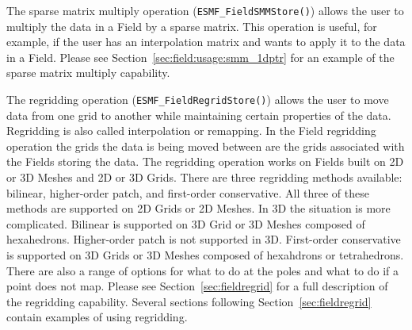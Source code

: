 The sparse matrix multiply operation ({\tt ESMF\_FieldSMMStore()}) allows the user to multiply the data in a Field by a sparse matrix. This operation is useful, for example, if the user has an interpolation matrix and wants to apply it to the data in a Field. Please see Section~\ref{sec:field:usage:smm_1dptr}
for an example of the sparse matrix multiply capability.

The regridding operation ({\tt ESMF\_FieldRegridStore()}) allows the user to move data from one grid to another while maintaining certain properties
of the data. Regridding is also called interpolation or remapping. In the Field regridding operation the grids the data is being moved between
are the grids associated with the Fields storing the data. The regridding operation works on Fields built on 2D or 3D Meshes and 2D or 3D Grids. 
There are three regridding methods available: bilinear, higher-order patch, and first-order conservative. All three of these methods are 
supported on 2D Grids or 2D Meshes. In 3D the situation is more complicated. Bilinear 
is supported on 3D Grid or 3D Meshes composed of hexahedrons. Higher-order patch is not supported in 3D. First-order conservative 
is supported on 3D Grids or 3D Meshes composed of hexahdrons or tetrahedrons. There are also a range of options for what to do at the poles and what to do 
if a point does not map. Please see Section~\ref{sec:fieldregrid} for a full description of the regridding capability. Several sections following Section~\ref{sec:fieldregrid} 
contain examples of using regridding. 







